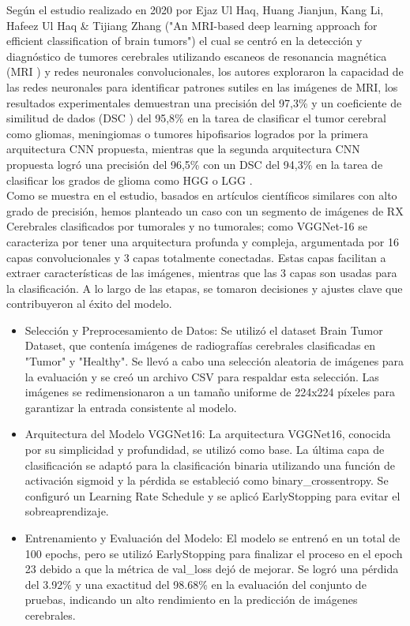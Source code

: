 \documentclass[12pt,twoside,titlepage]{ingenius}
\begin{document}
\begin{multicols}{2}
Según el estudio realizado en 2020 por Ejaz Ul Haq, Huang Jianjun, Kang Li, Hafeez Ul Haq \& Tijiang Zhang ("An MRI-based deep learning approach for efficient classification of brain tumors") \cite{17} el cual se centró en la detección y diagnóstico de tumores cerebrales utilizando escaneos de resonancia magnética (MRI ) y redes neuronales convolucionales, los autores exploraron la capacidad de las redes neuronales para identificar patrones sutiles en las imágenes de MRI, los resultados experimentales demuestran una precisión del 97,3\% y un coeficiente de similitud de dados (DSC ) del 95,8\% en la tarea de clasificar el tumor cerebral como gliomas, meningiomas o tumores hipofisarios logrados por la primera arquitectura CNN propuesta, mientras que la segunda arquitectura CNN propuesta logró una precisión del 96,5\% con un DSC del 94,3\% en la tarea de clasificar los grados de glioma como HGG  o LGG . \\

Como se muestra en el estudio, basados en artículos científicos similares con alto grado de precisión, hemos planteado un caso con un segmento de imágenes de RX Cerebrales clasificados por tumorales y no tumorales; como VGGNet-16 se caracteriza por tener una arquitectura profunda y compleja, argumentada por 16 capas convolucionales y 3 capas totalmente conectadas. Estas capas facilitan a extraer características de las imágenes, mientras que las 3 capas son usadas para la clasificación. 
A lo largo de las etapas, se tomaron decisiones y ajustes clave que contribuyeron al éxito del modelo.
\begin{itemize}
	\item Selección y Preprocesamiento de Datos: Se utilizó el dataset Brain Tumor Dataset, que contenía imágenes de radiografías cerebrales clasificadas en "Tumor" y "Healthy". Se llevó a cabo una selección aleatoria de imágenes para la evaluación y se creó un archivo CSV para respaldar esta selección. Las imágenes se redimensionaron a un tamaño uniforme de 224x224 píxeles para garantizar la entrada consistente al modelo.
	\item Arquitectura del Modelo VGGNet16: La arquitectura VGGNet16, conocida por su simplicidad y profundidad, se utilizó como base. La última capa de clasificación se adaptó para la clasificación binaria utilizando una función de activación sigmoid y la pérdida se estableció como binary\_crossentropy. Se configuró un Learning Rate Schedule y se aplicó EarlyStopping para evitar el sobreaprendizaje.
	\item Entrenamiento y Evaluación del Modelo: El modelo se entrenó en un total de 100 epochs, pero se utilizó EarlyStopping para finalizar el proceso en el epoch 23 debido a que la métrica de val\_loss dejó de mejorar. Se logró una pérdida del 3.92\% y una exactitud del 98.68\% en la evaluación del conjunto de pruebas, indicando un alto rendimiento en la predicción de imágenes cerebrales.
\end{itemize}


\end{multicols}
\end{document}
